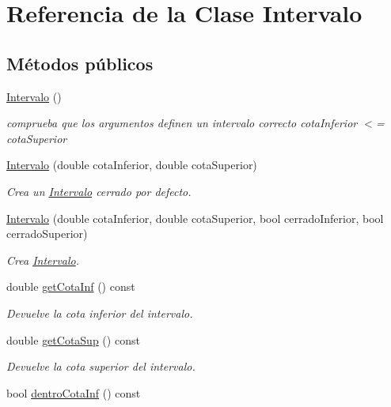 \hypertarget{classIntervalo}{}\section{Referencia de la Clase Intervalo}
\label{classIntervalo}
\subsection*{Métodos públicos}
\begin{DoxyCompactItemize}
\item 
\hyperlink{classIntervalo_a9b5b23dda7ee26b444898457959cb03d}{Intervalo} ()
\begin{DoxyCompactList}\small\item\em comprueba que los argumentos definen un intervalo correcto cota\+Inferior $<$= cota\+Superior \end{DoxyCompactList}\item 
\hyperlink{classIntervalo_a321e56ef7e1f4a774bd64cc2609156f4}{Intervalo} (double cota\+Inferior, double cota\+Superior)
\begin{DoxyCompactList}\small\item\em Crea un \hyperlink{classIntervalo}{Intervalo} cerrado por defecto. \end{DoxyCompactList}\item 
\hyperlink{classIntervalo_af70d523399465f51862977a303656c72}{Intervalo} (double cota\+Inferior, double cota\+Superior, bool cerrado\+Inferior, bool cerrado\+Superior)
\begin{DoxyCompactList}\small\item\em Crea \hyperlink{classIntervalo}{Intervalo}. \end{DoxyCompactList}\item 
double \hyperlink{classIntervalo_aafa3f6ec78c6bd44b568e343fb22fc90}{get\+Cota\+Inf} () const
\begin{DoxyCompactList}\small\item\em Devuelve la cota inferior del intervalo. \end{DoxyCompactList}\item 
double \hyperlink{classIntervalo_a2dd767a860e4e85ec3d5a44e78884b76}{get\+Cota\+Sup} () const
\begin{DoxyCompactList}\small\item\em Devuelve la cota superior del intervalo. \end{DoxyCompactList}\item 
bool \hyperlink{classIntervalo_aac8f7b98dd0d702086ea897f5c9ad932}{dentro\+Cota\+Inf} () const

\end{DoxyCompactItemize}
